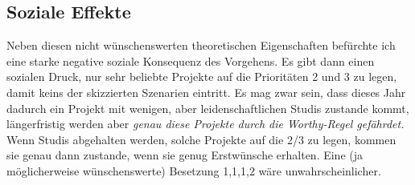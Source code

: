 \documentclass[11pt,a4paper]{article}
\begin{document}
\subsection{Soziale Effekte}
Neben diesen nicht wünschenswerten theoretischen Eigenschaften befürchte ich eine starke negative soziale Konsequenz des Vorgehens. Es gibt dann einen sozialen Druck, nur sehr beliebte Projekte auf die Prioritäten 2 und 3 zu legen, damit keins der skizzierten Szenarien eintritt. Es mag zwar sein, dass dieses Jahr dadurch ein Projekt mit wenigen, aber leidenschaftlichen Studis zustande kommt, längerfristig werden aber \textit{genau diese Projekte durch die Worthy-Regel gefährdet.} Wenn Studis abgehalten werden, solche Projekte auf die 2/3 zu legen, kommen sie genau dann zustande, wenn sie genug Erstwünsche erhalten. Eine (ja möglicherweise wünschenswerte) Besetzung 1,1,1,2 wäre unwahrscheinlicher.
\end{document}
